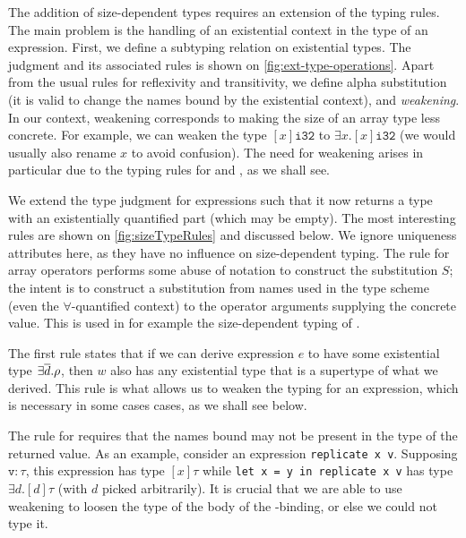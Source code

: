 The addition of size-dependent types requires an extension of the
typing rules.  The main problem is the handling of an existential
context in the type of an expression.  First, we define a subtyping
relation on existential types.  The judgment and its associated rules
is shown on \cref{fig:ext-type-operations}.  Apart from the usual
rules for reflexivity and transitivity, we define alpha substitution
(it is valid to change the names bound by the existential context),
and \textit{weakening}.  In our context, weakening corresponds to
making the size of an array type less concrete.  For example, we can
weaken the type $[x]\texttt{i32}$ to $\exists x.[x]\texttt{i32}$ (we
would usually also rename $x$ to avoid confusion).  The need for
weakening arises in particular due to the typing rules for 
and , as we shall see.

We extend the type judgment for expressions such that it now returns a
type with an existentially quantified part (which may be empty).  The
most interesting rules are shown on \cref{fig:sizeTypeRules} and
discussed below.  We ignore uniqueness attributes here, as they have
no influence on size-dependent typing.  The rule for array operators
performs some abuse of notation to construct the substitution $S$; the
intent is to construct a substitution from names used in the type
scheme (even the $\forall$-quantified context) to the operator
arguments supplying the concrete value.  This is used in for example
the size-dependent typing of .

The first rule states that if we can derive expression $e$ to have
some existential type $\exists\overline{d}.\rho$, then $w$ also has any
existential type that is a supertype of what we derived.  This rule is
what allows us to weaken the typing for an expression, which is
necessary in some cases cases, as we shall see below.

The rule for  requires that the names bound may not be present
in the type of the returned value.  As an example, consider an
expression \lstinline{replicate x v}.  Supposing $\texttt{v}: \tau$,
this expression has type $[x]\tau$ %
while \mbox{\lstinline{let x = y in replicate x v}} has type
$\exists d.[d]\tau$ (with $d$ picked arbitrarily).  It is crucial that
we are able to use weakening to loosen the type of the body of the
-binding, or else we could not type it.

